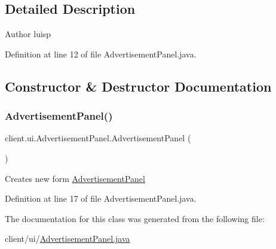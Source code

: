 \subsection{Detailed Description}
\begin{DoxyAuthor}{Author}
luisp 
\end{DoxyAuthor}


Definition at line 12 of file Advertisement\+Panel.\+java.



\subsection{Constructor \& Destructor Documentation}
\hypertarget{classclient_1_1ui_1_1_advertisement_panel_a171949b3f26ea771832fa714c352b9e6}{}\label{classclient_1_1ui_1_1_advertisement_panel_a171949b3f26ea771832fa714c352b9e6} 
\subsubsection{\texorpdfstring{Advertisement\+Panel()}{AdvertisementPanel()}}
{\footnotesize\ttfamily client.\+ui.\+Advertisement\+Panel.\+Advertisement\+Panel (\begin{DoxyParamCaption}{ }\end{DoxyParamCaption})}

Creates new form \hyperlink{classclient_1_1ui_1_1_advertisement_panel}{Advertisement\+Panel} 

Definition at line 17 of file Advertisement\+Panel.\+java.



The documentation for this class was generated from the following file\+:\begin{DoxyCompactItemize}
\item 
client/ui/\hyperlink{_advertisement_panel_8java}{Advertisement\+Panel.\+java}\end{DoxyCompactItemize}
